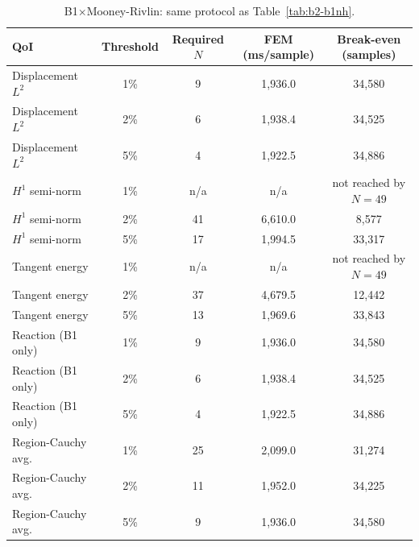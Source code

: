 \documentclass[final,5p,times]{elsarticle}
\begin{document}
\begin{table}[ht]
\centering
\caption{B1$\times$Mooney-Rivlin: same protocol as Table~\ref{tab:b2-b1nh}.}
\label{tab:b2-b1mr}
\small
\begin{tabular}{lcccc}
\toprule
QoI & Threshold & Required $N$ & FEM (ms/sample) & Break-even (samples) \\
\midrule
Displacement $L^2$  & 1\% & 9   & 1{,}936.0 & 34{,}580 \\
Displacement $L^2$  & 2\% & 6   & 1{,}938.4 & 34{,}525 \\
Displacement $L^2$  & 5\% & 4   & 1{,}922.5 & 34{,}886 \\
$H^1$ semi-norm     & 1\% & n/a & n/a       & not reached by $N{=}49$ \\
$H^1$ semi-norm     & 2\% & 41  & 6{,}610.0 & 8{,}577 \\
$H^1$ semi-norm     & 5\% & 17  & 1{,}994.5 & 33{,}317 \\
Tangent energy      & 1\% & n/a & n/a       & not reached by $N{=}49$ \\
Tangent energy      & 2\% & 37  & 4{,}679.5 & 12{,}442 \\
Tangent energy      & 5\% & 13  & 1{,}969.6 & 33{,}843 \\
Reaction (B1 only)  & 1\% & 9   & 1{,}936.0 & 34{,}580 \\
Reaction (B1 only)  & 2\% & 6   & 1{,}938.4 & 34{,}525 \\
Reaction (B1 only)  & 5\% & 4   & 1{,}922.5 & 34{,}886 \\
Region-Cauchy avg.\ & 1\% & 25  & 2{,}099.0 & 31{,}274 \\
Region-Cauchy avg.\ & 2\% & 11  & 1{,}952.0 & 34{,}225 \\
Region-Cauchy avg.\ & 5\% & 9   & 1{,}936.0 & 34{,}580 \\
\bottomrule
\end{tabular}
\end{table}
\end{document}
